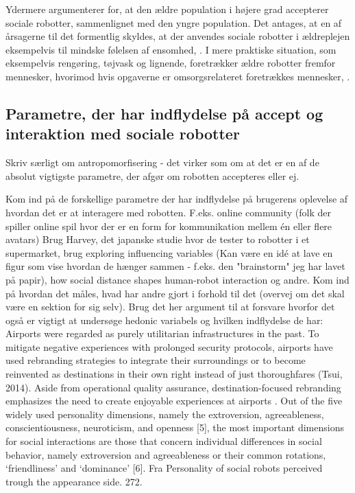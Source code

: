 Ydermere argumenterer \textcite[s. 2]{PDF:SharingALifeHarvey} for, at den ældre population i højere grad accepterer sociale robotter, sammenlignet med den yngre population. Det antages, at en af årsagerne til det formentlig skyldes, at der anvendes sociale robotter i ældreplejen eksempelvis til mindske følelsen af ensomhed, . I mere praktiske situation, som eksempelvis rengøring, tøjvask og lignende, foretrækker ældre robotter fremfor mennesker, hvorimod hvis opgaverne er omsorgsrelateret foretrækkes mennesker, \parencite[s. 22]{PDF:RobotShiftFromIPtoSR}.

\subsection{Parametre, der har indflydelse på accept og interaktion med sociale robotter}
\label{InteraktionSocialeRobotterParametre}
%



Skriv særligt om antropomorfisering - det virker som om at det er en af de absolut vigtigste parametre, der afgør om robotten accepteres eller ej. 


Kom ind på de forskellige parametre der har indflydelse på brugerens oplevelse af hvordan det er at interagere med robotten. F.eks. online community (folk der spiller online spil hvor der er en form for kommunikation mellem én eller flere avatars) \blankline
%
Brug Harvey, det japanske studie hvor de tester to robotter i et supermarket, brug exploring influencing variables (Kan være en idé at lave en figur som vise hvordan de hænger sammen - f.eks. den "brainstorm" jeg har lavet på papir), how social distance shapes human-robot interaction og andre. \blankline
%
Kom ind på hvordan det måles, hvad har andre gjort i forhold til det (overvej om det skal være en sektion for sig selv).\blankline
%
Brug det her argument til at forsvare hvorfor det også er vigtigt at undersøge hedonic variabels og hvilken indflydelse de har: Airports were regarded as purely utilitarian infrastructures in the past. To mitigate negative experiences with prolonged security protocols, airports have used rebranding strategies to integrate their surroundings or to become reinvented as destinations in their own right instead of just thoroughfares (Tsui, 2014). Aside from operational quality assurance, destination-focused rebranding emphasizes the need to create enjoyable experiences at airports \textcite[s. 352]{PDF:TheImpactOfTraveler}.\blankline
%
Out of the five widely used personality dimensions, namely the extroversion, agreeableness, conscientiousness, neuroticism, and openness [5], the most important dimensions for social interactions are those that concern individual differences in social behavior, namely extroversion and agreeableness or their common rotations, ‘friendliness’ and ‘dominance’ [6]. Fra Personality of social robots perceived trough the appearance side. 272.

